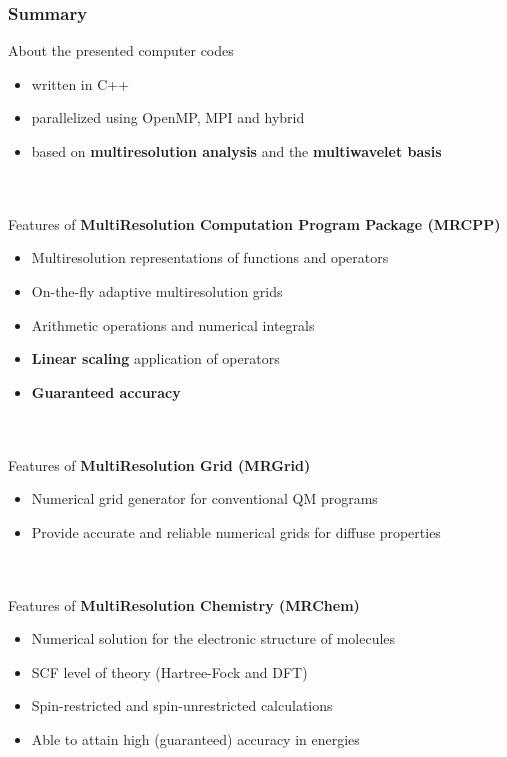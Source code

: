 \documentclass[mathserif, 8pt]{beamer}
\begin{document}
\begin{frame}
    \frametitle{Summary}
    About the presented computer codes
    \begin{itemize}
	\item	written in C++
	\item	parallelized using OpenMP, MPI and hybrid
	\item	based on \textbf{multiresolution analysis} and the \textbf{multiwavelet basis}
    \end{itemize}
    \ \\
    \ \\
    Features of \textbf{MultiResolution Computation Program Package (MRCPP)}
    \begin{itemize}
	\item	Multiresolution representations of functions and operators
	\item	On-the-fly adaptive multiresolution grids
	\item	Arithmetic operations and numerical integrals
	\item	\textbf{Linear scaling} application of operators
	\item	\textbf{Guaranteed accuracy}
    \end{itemize}
    \ \\
    \ \\
    Features of \textbf{MultiResolution Grid (MRGrid)}
    \begin{itemize}
	\item	Numerical grid generator for conventional QM programs
	\item	Provide accurate and reliable numerical grids for diffuse properties
    \end{itemize}
    \ \\
    \ \\
    Features of \textbf{MultiResolution Chemistry (MRChem)}
    \begin{itemize}
	\item	Numerical solution for the electronic structure of molecules
	\item	SCF level of theory (Hartree-Fock and DFT)
	\item	Spin-restricted and spin-unrestricted calculations
	\item	Able to attain high (guaranteed) accuracy in energies
    \end{itemize}
\end{frame}
\end{document}
